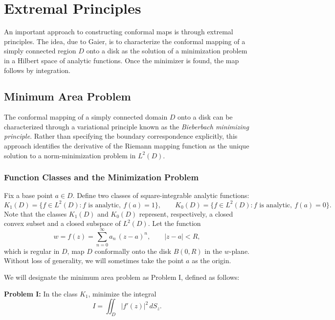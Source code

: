 \documentclass[12pt,a4paper]{article}
\begin{document}
\section{Extremal Principles}

An important approach to constructing conformal maps is through extremal principles. The idea, due to Gaier, is to characterize the conformal mapping of a simply connected region \(D\) onto a disk as the solution of a minimization problem in a Hilbert space of analytic functions. Once the minimizer is found, the map follows by integration.

\subsection{Minimum Area Problem}

The conformal mapping of a simply connected domain \(D\) onto a disk can be characterized through a variational principle known as the \textit{Bieberbach minimizing principle}. Rather than specifying the boundary correspondence explicitly, this approach identifies the derivative of the Riemann mapping function as the unique solution to a norm-minimization problem in \(L^2(D)\).

\subsubsection{Function Classes and the Minimization Problem}

Fix a base point \(a \in D\). Define two classes of square-integrable analytic functions:
\[
K_1(D) = \bigl\{ f \in L^2(D) : f \text{ is analytic}, \ f(a) = 1 \bigr\}, \qquad K_0(D) = \bigl\{ f \in L^2(D) : f \text{ is analytic}, \ f(a) = 0 \bigr\}.
\]
Note that the classes \(K_1(D)\) and \(K_0(D)\) represent, respectively, a closed convex subset and a closed subspace of \(L^2(D)\). Let the function
\[
w = f(z) = \sum_{n=0}^{\infty} a_n\,(z - a)^n, \qquad |z - a| < R,
\]
which is regular in \(D\), map \(D\) conformally onto the disk \(B(0,R)\) in the \(w\)-plane. Without loss of generality, we will sometimes take the point \(a\) as the origin.

We will designate the minimum area problem as Problem I, defined as follows:

\begin{formulabox}
\textbf{Problem I:} In the class \(K_1\), minimize the integral
\[
I = \iint_D |f'(z)|^2\,dS_z.
\]
\end{formulabox}
\end{document}
